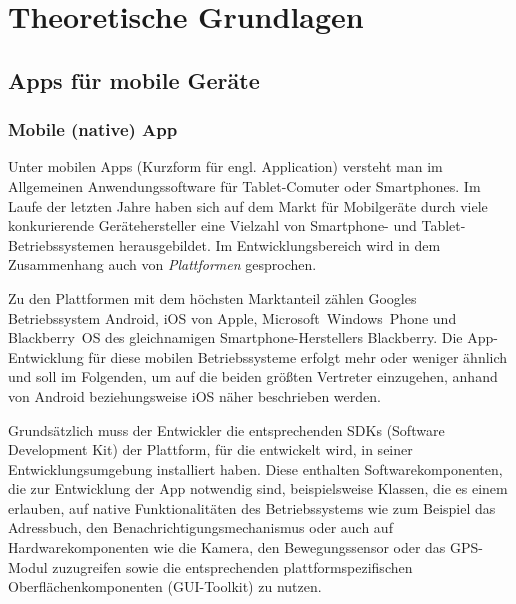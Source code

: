 \chapter{Theoretische Grundlagen}

\section{Apps für mobile Geräte} %

\subsection{Mobile (native) App} \label{native}
Unter mobilen Apps (Kurzform für engl. \glqq Application\grqq) versteht man im Allgemeinen Anwendungssoftware für Tablet-Comuter oder Smartphones. 
Im Laufe der letzten Jahre haben sich auf dem Markt für Mobilgeräte durch viele konkurierende Gerätehersteller eine Vielzahl von Smartphone- und Tablet-Betriebssystemen herausgebildet. 
Im Entwicklungsbereich wird in dem Zusammenhang auch von \emph{Plattformen} gesprochen.

Zu den Plattformen mit dem höchsten Marktanteil zählen Googles Betriebssystem Android, iOS von Apple, Microsoft~Windows~Phone und Blackberry~OS des gleichnamigen Smartphone-Herstellers Blackberry.\cite{platforms-marketshare}
Die App-Entwicklung für diese mobilen Betriebssysteme erfolgt mehr oder weniger ähnlich und soll im Folgenden, um auf die beiden größten Vertreter einzugehen, anhand von Android beziehungsweise iOS näher beschrieben werden.

Grundsätzlich muss der Entwickler die entsprechenden SDKs (Software Development Kit) der Plattform, für die entwickelt wird, in seiner Entwicklungsumgebung installiert haben. 
Diese enthalten Softwarekomponenten, die zur Entwicklung der App notwendig sind, beispielsweise Klassen, die es einem erlauben, auf native Funktionalitäten des Betriebssystems wie zum Beispiel das Adressbuch, den Benachrichtigungsmechanismus oder auch auf Hardwarekomponenten wie die Kamera, den Bewegungssensor oder das GPS-Modul zuzugreifen sowie die entsprechenden plattformspezifischen Oberflächenkomponenten (GUI-Toolkit) zu nutzen.

